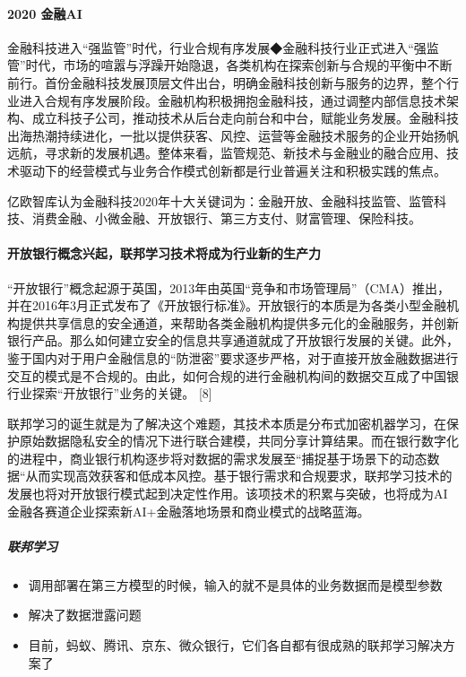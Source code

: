 \documentclass[letterpaper,11pt,english]{sphinxmanual}
\begin{document}
\paragraph{2020 金融AI}
\label{\detokenize{chapter_project/AI_Finance:id14}}
金融科技进入“强监管”时代，行业合规有序发展◆金融科技行业正式进入“强监管”时代，市场的喧嚣与浮躁开始隐退，各类机构在探索创新与合规的平衡中不断前行。首份金融科技发展顶层文件出台，明确金融科技创新与服务的边界，整个行业进入合规有序发展阶段。金融机构积极拥抱金融科技，通过调整内部信息技术架构、成立科技子公司，推动技术从后台走向前台和中台，赋能业务发展。金融科技出海热潮持续进化，一批以提供获客、风控、运营等金融技术服务的企业开始扬帆远航，寻求新的发展机遇。整体来看，监管规范、新技术与金融业的融合应用、技术驱动下的经营模式与业务合作模式创新都是行业普遍关注和积极实践的焦点。

亿欧智库认为金融科技2020年十大关键词为：金融开放、金融科技监管、监管科技、消费金融、小微金融、开放银行、第三方支付、财富管理、保险科技。


\paragraph{开放银行概念兴起，联邦学习技术将成为行业新的生产力}
\label{\detokenize{chapter_project/AI_Finance:id15}}
“开放银行”概念起源于英国，2013年由英国“竞争和市场管理局”（CMA）推出，并在2016年3月正式发布了《开放银行标准》。开放银行的本质是为各类小型金融机构提供共享信息的安全通道，来帮助各类金融机构提供多元化的金融服务，并创新银行产品。那么如何建立安全的信息共享通道就成了开放银行发展的关键。此外，鉴于国内对于用户金融信息的“防泄密”要求逐步严格，对于直接开放金融数据进行交互的模式是不合规的。由此，如何合规的进行金融机构间的数据交互成了中国银行业探索“开放银行”业务的关键。
{[}8{]}

联邦学习的诞生就是为了解决这个难题，其技术本质是分布式加密机器学习，在保护原始数据隐私安全的情况下进行联合建模，共同分享计算结果。而在银行数字化的进程中，商业银行机构逐步将对数据的需求发展至“捕捉基于场景下的动态数据“从而实现高效获客和低成本风控。基于银行需求和合规要求，联邦学习技术的发展也将对开放银行模式起到决定性作用。该项技术的积累与突破，也将成为AI金融各赛道企业探索新AI+金融落地场景和商业模式的战略蓝海。


\subparagraph{联邦学习}
\label{\detokenize{chapter_project/AI_Finance:id16}}\begin{itemize}
\item {} 
调用部署在第三方模型的时候，输入的就不是具体的业务数据而是模型参数

\item {} 
解决了数据泄露问题

\item {} 
目前，蚂蚁、腾讯、京东、微众银行，它们各自都有很成熟的联邦学习解决方案了

\end{itemize}
\end{document}
